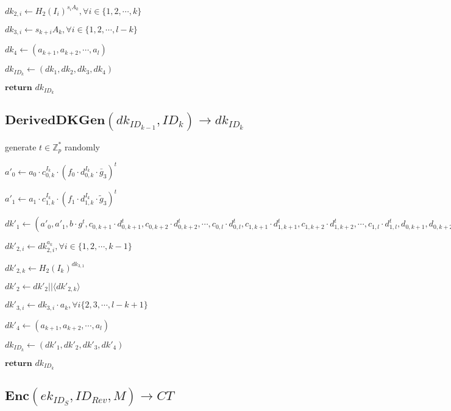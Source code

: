 \documentclass[a4paper]{article}
\begin{document}
$\textit{dk}_{2, i} \gets H_2(I_i)^{s_i A_k}, \forall i \in \{1, 2, \cdots, k\}$

$\textit{dk}_{3, i} \gets s_{k + i}A_k, \forall i \in \{1, 2, \cdots, l - k\}$

$\textit{dk}_4 \gets (a_{k + 1}, a_{k + 2}, \cdots, a_l)$

$\textit{dk}_{\textit{ID}_k} \gets (\textit{dk}_1, \textit{dk}_2, \textit{dk}_3, \textit{dk}_4)$

$\textbf{return }\textit{dk}_{\textit{ID}_k}$

\subsection{$\textbf{DerivedDKGen}(\textit{dk}_{\textit{ID}_{k - 1}}, \textit{ID}_k) \rightarrow \textit{dk}_{\textit{ID}_k}$}

generate $t \in \mathbb{Z}_p^*$ randomly

$a'_0 \gets a_0 \cdot c_{0, k}^{I_k} \cdot (f_0 \cdot d_{0, k}^{I_k} \cdot \bar{g}_3)^t$

$a'_1 \gets a_1 \cdot c_{1, k}^{I_k} \cdot (f_1 \cdot d_{1, k}^{I_k} \cdot \tilde{g}_3)^t$

$\textit{dk}'_1 \gets (
a'_0, a'_1, b \cdot g^t,
c_{0, k + 1} \cdot d_{0, k + 1}^t, c_{0, k + 2} \cdot d_{0, k + 2}^t, \cdots, c_{0, l} \cdot d_{0, l}^t,
c_{1, k + 1} \cdot d_{1, k + 1}^t, c_{1, k + 2} \cdot d_{1, k + 2}^t, \cdots, c_{1, l} \cdot d_{1, l}^t,
d_{0, k + 1}, d_{0, k + 2}, \cdots, d_{0, l},
d_{1, k + 1}, d_{1, k + 2}, \cdots, d_{1, l},
f_0 \cdot c_{0, k}^{I_k}, f_1 \cdot c_{1, k}^{I_k}
)$

$\textit{dk}'_{2, i} \gets \textit{dk}_{2, i}^{a_k}, \forall i \in \{1, 2, \cdots, k - 1\}$

$\textit{dk}'_{2, k} \gets H_2(I_k)^{\textit{dk}_{3, 1}}$

$\textit{dk}'_2 \gets \textit{dk}'_2 || \langle\textit{dk}'_{2, k}\rangle$

$\textit{dk}'_{3, i} \gets \textit{dk}_{3, i} \cdot a_k, \forall i \{2, 3, \cdots, l - k + 1\}$

$\textit{dk}'_4 \gets (a_{k + 1}, a_{k + 2}, \cdots, a_l)$

$\textit{dk}_{\textit{ID}_k} \gets (\textit{dk}'_1, \textit{dk}'_2, \textit{dk}'_3, \textit{dk}'_4)$

$\textbf{return }\textit{dk}_{\textit{ID}_k}$

\subsection{$\textbf{Enc}(\textit{ek}_{\textit{ID}_S}, \textit{ID}_\textit{Rev}, M) \rightarrow \textit{CT}$}
\end{document}
